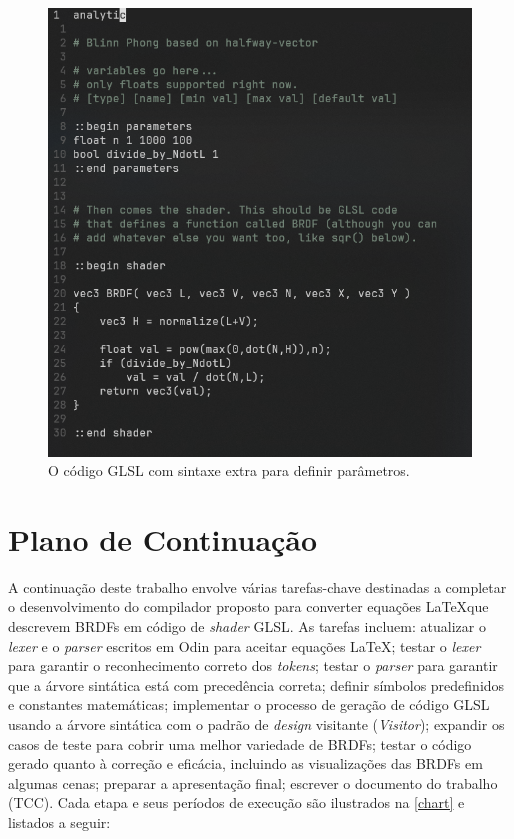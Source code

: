 \documentclass[english, 
               brazil, 
               bsc] %
               {dcomp-abntex2}
\begin{document}
\begin{figure}[htb]
        \caption{\label{fig-disney-code} \small O código GLSL com sintaxe extra para definir parâmetros.}
        \begin{center}
            \includegraphics[scale=0.7]{./Imagens/disney-brdf-code.png}
        \end{center}
\end{figure}






\section{Plano de Continuação} \label{continuacao}


A continuação deste trabalho envolve várias tarefas-chave destinadas a completar o desenvolvimento do compilador proposto para converter equações \LaTeX  que descrevem BRDFs em código de \textit{shader} GLSL. As tarefas incluem: atualizar o \textit{lexer} e o \textit{parser} escritos em Odin para aceitar equações \LaTeX; testar o \textit{lexer} para garantir o reconhecimento correto dos \textit{tokens}; testar o \textit{parser} para garantir que a árvore sintática está com precedência correta; definir símbolos predefinidos e constantes matemáticas; implementar o processo de geração de código GLSL usando a árvore sintática com o padrão de \textit{design} visitante (\textit{Visitor}); expandir os casos de teste para cobrir uma melhor variedade de BRDFs; testar o código gerado quanto à correção e eficácia, incluindo as visualizações das BRDFs em algumas cenas; preparar a apresentação final; escrever o documento do trabalho (TCC). Cada etapa e seus períodos de execução são ilustrados na \autoref{chart} e listados a seguir:
\end{document}
